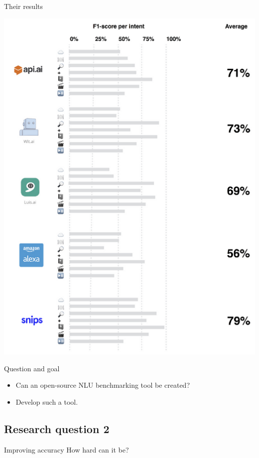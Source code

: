 \documentclass[pdf]{beamer}
\begin{document}
    \begin{frame}{Their results}
        \begin{center}
            \includegraphics[height=0.85\textheight]{figures/snips_own_benchmark.png}
        \end{center}
    \end{frame}

    \begin{frame}{Question and goal}
        \begin{itemize}
            \item Can an open-source NLU benchmarking tool be created?
            \item Develop such a tool.
        \end{itemize}
    \end{frame}

    \subsection{Research question 2}
    \begin{frame}{Improving accuracy}
        How hard can it be?
    \end{frame}
\end{document}
